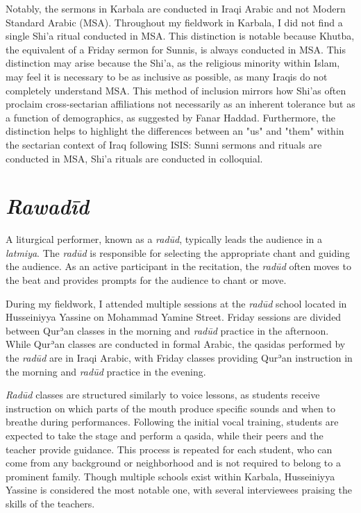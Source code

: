 Notably, the sermons in Karbala are conducted in Iraqi Arabic and not Modern Standard Arabic (MSA). Throughout my fieldwork in Karbala, I did not find a single Shi'a ritual conducted in MSA. This distinction is notable because Khutba, the equivalent of a Friday sermon for Sunnis, is always conducted in MSA. This distinction may arise because the Shi'a, as the religious minority within Islam, may feel it is necessary to be as inclusive as possible, as many Iraqis do not completely understand MSA. This method of inclusion mirrors how Shi'as often proclaim cross-sectarian affiliations not necessarily as an inherent tolerance but as a function of demographics, as suggested by Fanar Haddad\cite[183]{haddad_understanding_2020}. Furthermore, the distinction helps to highlight the differences between an "us" and "them" within the sectarian context of Iraq following ISIS: Sunni sermons and rituals are conducted in MSA, Shi'a rituals are conducted in colloquial.

\section{\emph{Rawadīd}}
A liturgical performer, known as a \emph{radūd}, typically leads the audience in a \emph{latmiya}. The \emph{radūd} is responsible for selecting the appropriate chant and guiding the audience. As an active participant in the recitation, the \emph{radūd} often moves to the beat and provides prompts for the audience to chant or move.

During my fieldwork, I attended multiple sessions at the \emph{radūd} school located in Husseiniyya Yassine on Mohammad Yamine Street. Friday sessions are divided between Qurʾan classes in the morning and \emph{radūd} practice in the afternoon. While Qurʾan classes are conducted in formal Arabic, the qasidas performed by the \emph{radūd} are in Iraqi Arabic, with Friday classes providing Qurʾan instruction in the morning and \emph{radūd} practice in the evening.

\emph{Radūd} classes are structured similarly to voice lessons, as students receive instruction on which parts of the mouth produce specific sounds and when to breathe during performances. Following the initial vocal training, students are expected to take the stage and perform a qasida, while their peers and the teacher provide guidance. This process is repeated for each student, who can come from any background or neighborhood and is not required to belong to a prominent family. Though multiple schools exist within Karbala, Husseiniyya Yassine is considered the most notable one, with several interviewees praising the skills of the teachers.

